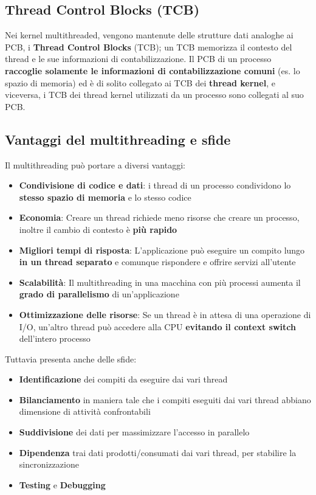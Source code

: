 \documentclass[12pt]{article}
\begin{document}
\subsection{Thread Control Blocks (TCB)}
Nei kernel multithreaded, vengono mantenute delle strutture dati analoghe ai PCB, i \textbf{Thread Control Blocks} (TCB); un TCB memorizza il contesto del thread e le sue informazioni di contabilizzazione. Il PCB di un processo \textbf{raccoglie solamente le informazioni di contabilizzazione comuni} (es. lo spazio di memoria) ed è di solito collegato ai TCB dei \textbf{thread kernel}, e viceversa, i TCB dei thread kernel utilizzati da un processo sono collegati al suo PCB.
\subsection{Vantaggi del multithreading e sfide}
Il multithreading può portare a diversi vantaggi:
\begin{itemize}
    \item \textbf{Condivisione di codice e dati}: i thread di un processo condividono lo \textbf{stesso spazio di memoria} e lo stesso codice
    \item \textbf{Economia}: Creare un thread richiede meno risorse che creare un processo, inoltre il cambio di contesto è \textbf{più rapido}
    \item \textbf{Migliori tempi di risposta}: L'applicazione può eseguire un compito lungo \textbf{in un thread separato} e comunque rispondere e offrire servizi all'utente
    \item \textbf{Scalabilità}: Il multithreading in una macchina con più processi aumenta il \textbf{grado di parallelismo} di un'applicazione
    \item \textbf{Ottimizzazione delle risorse}: Se un thread è in attesa di una operazione di I/O, un'altro thread può accedere alla CPU \textbf{evitando il context switch} dell'intero processo
\end{itemize}
Tuttavia presenta anche delle sfide:
\begin{itemize}
    \item \textbf{Identificazione} dei compiti da eseguire dai vari thread
    \item \textbf{Bilanciamento} in maniera tale che i compiti eseguiti dai vari thread abbiano dimensione di attività confrontabili
    \item \textbf{Suddivisione} dei dati per massimizzare l'accesso in parallelo
    \item \textbf{Dipendenza} trai dati prodotti/consumati dai vari thread, per stabilire la sincronizzazione
    \item \textbf{Testing} e \textbf{Debugging}
\end{itemize}
\end{document}
